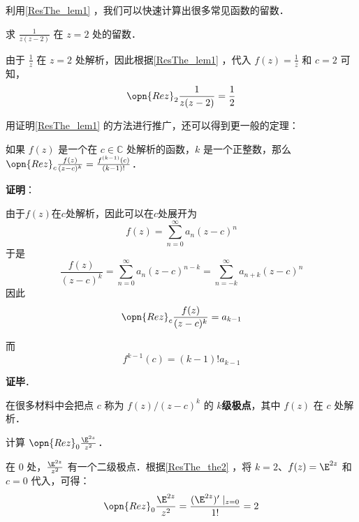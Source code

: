 利用\autoref{ResThe_lem1} ，我们可以快速计算出很多常见函数的留数．

\begin{example}{}
求 $\frac{1}{z(z-2)}$ 在 $z=2$ 处的留数．

由于 $\frac{1}{z}$ 在 $z=2$ 处解析，因此根据\autoref{ResThe_lem1} ，代入 $f(z)=\frac{1}{z}$ 和 $c=2$ 可知，
\begin{equation}
\opn{Rez}_2\frac{1}{z(z-2)}=\frac{1}{2}
\end{equation}
\end{example}

用证明\autoref{ResThe_lem1} 的方法进行推广，还可以得到更一般的定理：

\begin{theorem}{}\label{ResThe_the2}
如果 $f(z)$ 是一个在 $c\in\mathbb{C}$ 处解析的函数，$k$ 是一个正整数，那么 $\opn{Rez}_c\frac{f(z)}{(z-c)^k}=\frac{f^{(k-1)}(c)}{(k-1)!}$．
\end{theorem}

\textbf{证明}：

由于$f(z)$在$c$处解析，因此可以在$c$处展开为
\begin{equation}
f(z) = \sum_{n=0}^\infty a_n(z-c)^n
\end{equation}
于是
\begin{equation}
\frac{f(z)}{(z-c)^k} = \sum_{n=0}^\infty a_n(z-c)^{n-k} = \sum_{n=-k}^\infty a_{n+k}(z-c)^n
\end{equation}
因此
\begin{equation}
\opn{Rez}_c\frac{f(z)}{(z-c)^k} = a_{k-1}
\end{equation}

而
\begin{equation}
f^{k-1}(c)=(k-1)!a_{k-1}
\end{equation}

\textbf{证毕}．




在很多材料中会把点 $c$ 称为 $f(z)/(z-c)^k$ 的 $k$\textbf{级极点}，其中 $f(z)$ 在 $c$ 处解析．

\begin{example}{}
计算 $\opn{Rez}_0 \frac{\E^{2z}}{z^2}$．

在 $0$ 处，$\frac{\E^{2z}}{z^2}$ 有一个二级极点．根据\autoref{ResThe_the2} ，将 $k=2$、$f(z)=\E^{2z}$ 和 $c=0$ 代入，可得：
\begin{equation}
\opn{Rez}_0\frac{\E^{2z}}{z^2}=\frac{(\E^{2z})'\mid_{z=0}}{1!}=2
\end{equation}


\end{example}












